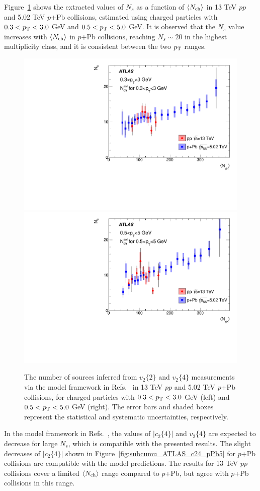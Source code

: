 Figure~\ref{fig:subcumu_ATLAS_Ns} shows the extracted values of $N_s$ as a function of $\left\langle N_\text{ch}\right\rangle$ in 13 TeV $pp$ and 5.02 TeV $p$+Pb collisions, estimated using charged particles with $0.3<p_\text{T}<3.0$ GeV and $0.5<p_\text{T}<5.0$ GeV. It is observed that the $N_s$ value increases with $\left\langle N_\text{ch}\right\rangle$ in $p$+Pb collisions, reaching $N_s\sim 20$ in the highest multiplicity class, and it is consistent between the two $p_\text{T}$ ranges.

\begin{figure}[H]
\centering
\includegraphics[width=.475\linewidth]{figs/chapter_subcumu/ATLAS_Ns_pT0.pdf}
\includegraphics[width=.475\linewidth]{figs/chapter_subcumu/ATLAS_Ns_pT1.pdf}
\caption{The number of sources inferred from $v_2\{2\}$ and $v_2\{4\}$ measurements via the model framework in Refs.~\cite{Bzdak:2013rya, Yan:2013laa} in 13 TeV $pp$ and 5.02 TeV $p$+Pb collisions, for charged particles with $0.3<p_\text{T}<3.0$ GeV (left) and $0.5<p_\text{T}<5.0$ GeV (right). The error bars and shaded boxes represent the statistical and systematic uncertainties, respectively.}
\label{fig:subcumu_ATLAS_Ns}
\end{figure}

In the model framework in Refs.~\cite{Bzdak:2013rya, Yan:2013laa}, the values of $|c_2\{4\}|$ and $v_2\{4\}$ are expected to decrease for large $N_s$, which is compatible with the presented results. The slight decreases of $|c_2\{4\}|$ shown in Figure~\ref{fig:subcumu_ATLAS_c24_pPb5} for $p$+Pb collisions are compatible with the model predictions. The results for 13 TeV $pp$ collisions cover a limited $\left\langle N_\text{ch}\right\rangle$ range compared to $p$+Pb, but agree with $p$+Pb collisions in this range.



